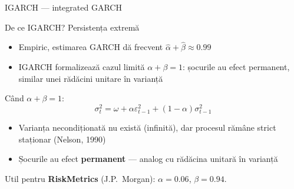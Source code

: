\documentclass[9pt, aspectratio=169, t]{beamer}
\begin{document}
\begin{frame}{IGARCH --- integrated GARCH}
    \small
    \vspace{-0.2cm}
        \begin{alertblock}{De ce IGARCH? Persistența extremă}
            \begin{itemize}
                \item Empiric, estimarea GARCH dă frecvent $\hat{\alpha} + \hat{\beta} \approx 0.99$
                \item IGARCH formalizează cazul limită $\alpha + \beta = 1$: șocurile au efect permanent, similar unei rădăcini unitare în varianță
            \end{itemize}
        \end{alertblock}
        \vspace{-0.15cm}
        \begin{defn}[IGARCH(1,1)]
            Când $\alpha + \beta = 1$:
            \vspace{-2mm}
            \[
                \sigma_t^2 = \omega + \alpha \varepsilon_{t-1}^2 + (1 - \alpha) \sigma_{t-1}^2
            \]
            \vspace{-2mm}
        \end{defn}
        \vspace{-0.15cm}
        \begin{prop}
            \begin{itemize}
                \item Varianța necondiționată nu există (infinită), dar procesul rămâne strict staționar (Nelson, 1990)
                \item Șocurile au efect \textbf{permanent} --- analog cu rădăcina unitară în varianță
            \end{itemize}
        \end{prop}
        \vspace{-0.15cm}
        \begin{rmk}
            Util pentru \textbf{RiskMetrics} (J.P.\ Morgan): $\alpha = 0.06$, $\beta = 0.94$.
        \end{rmk}
        \hfill{}
\end{frame}
\end{document}

